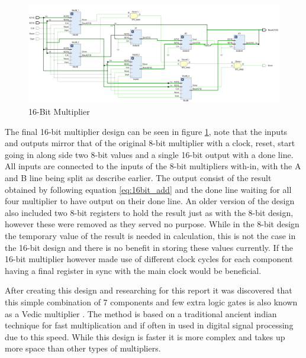 \documentclass[11pt]{article}
\begin{document}
\begin{figure}[H]         
    \centering
    \includegraphics[width=\textwidth]{16bit.png}
    \caption{16-Bit Multiplier}
    \label{fig:8bit}
\end{figure} 

The final 16-bit multiplier design can be seen in figure \ref{fig:8bit},
note that the inputs and outputs mirror that of the original 8-bit multiplier with a clock, reset, start going in along side two 8-bit values and a single 16-bit output with a done line.
All inputs are connected to the inputs of the 8-bit multipliers with-in, with the A and B line being split as describe earlier. 
The output consist of the result obtained by following equation \ref{eq:16bit_add} and the done line waiting for all four multiplier to have output on their done line.
An older version of the design also included two 8-bit registers to hold the result just as with the 8-bit design, however these were removed as they served no purpose.
While in the 8-bit design the temporary value of the result is needed in calculation, this is not the case in the 16-bit design and there is no benefit in storing these values currently.
If the 16-bit multiplier however made use of different clock cycles for each component having a final register in sync with the main clock would be beneficial.

After creating this design and researching for this report it was discovered that this simple combination of 7 components and few extra logic gates is also known as a Vedic multiplier \cite{vedic}.
The method is based on a traditional ancient indian technique for fast multiplication and if often in used in digital signal processing due to this speed.
While this design is faster it is more complex and takes up more space than other types of multipliers.
\end{document}
